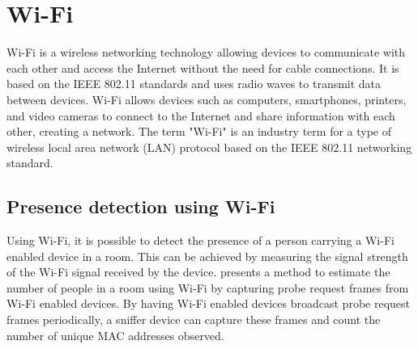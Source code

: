 \section{Wi-Fi} \label{sec:wi-fi}
Wi-Fi is a wireless networking technology allowing devices to communicate with each other and access the Internet without the need for cable connections.
It is based on the IEEE 802.11 standards and uses radio waves to transmit data between devices.
Wi-Fi allows devices such as computers, smartphones, printers, and video cameras to connect to the Internet and share information with each other, creating a network.
The term "Wi-Fi" is an industry term for a type of wireless local area network (LAN) protocol based on the IEEE 802.11 networking standard.\cite{WiFiAllianceDiscover,CiscoWhatIsWiFi}

\subsection{Presence detection using Wi-Fi}
Using Wi-Fi, it is possible to detect the presence of a person carrying a Wi-Fi enabled device in a room.
This can be achieved by measuring the signal strength of the Wi-Fi signal received by the device.
\citeauthor{longoAccurateOccupancyEstimation2019} presents a method to estimate the number of people in a room using Wi-Fi by capturing probe request frames from Wi-Fi enabled devices.
By having Wi-Fi enabled devices broadcast probe request frames periodically, a sniffer device can capture these frames and count the number of unique MAC addresses observed. \cite{longoAccurateOccupancyEstimation2019}




